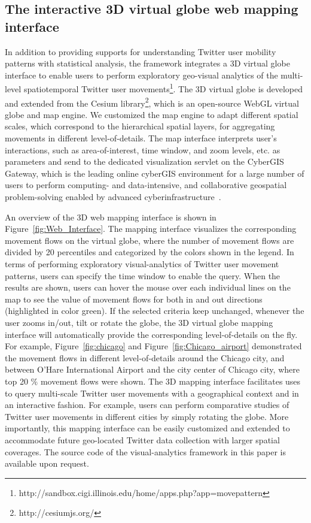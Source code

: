\documentclass[ijgi,article,submit,moreauthors,pdftex,10pt,a4paper]{mdpi}
\theoremstyle{mdpi}
\newcounter{ex}
\newcounter{re}
\theoremstyle{mdpidefinition}
\begin{document}
\subsection{The interactive 3D virtual globe web mapping interface}
In addition to providing supports for understanding Twitter user mobility patterns with statistical analysis, the framework integrates a 3D virtual globe interface to enable users to perform exploratory geo-visual analytics of the multi-level spatiotemporal Twitter user movements\footnote{http://sandbox.cigi.illinois.edu/home/apps.php?app=movepattern}. 
The 3D virtual globe is developed and extended from the Cesium library\footnote{http://cesiumjs.org/}, which is an open-source WebGL virtual globe and map engine.
We customized the map engine to adapt different spatial scales, which correspond to the hierarchical spatial layers, for aggregating movements in different level-of-details.
The map interface interprets user's interactions, such as area-of-interest, time window, and zoom levels, etc. as parameters and send to the dedicated visualization servlet on the CyberGIS Gateway, which is the leading online cyberGIS environment for a large number of users to perform computing- and data-intensive, and collaborative geospatial problem-solving enabled by advanced cyberinfrastructure~\cite{liu2014cybergis}.

An overview of the 3D web mapping interface is shown in Figure~\ref{fig:Web_Interface}.
The mapping interface visualizes the corresponding movement flows on the virtual globe, where the number of movement flows are divided by 20 percentiles and categorized by the colors shown in the legend.
In terms of performing exploratory visual-analytics of Twitter user movement patterns, users can specify the time window to enable the query. 
When the results are shown, users can hover the mouse over each individual lines on the map to see the value of movement flows for both in and out directions (highlighted in color green).
If the selected criteria keep unchanged, whenever the user zooms in/out, tilt or rotate the globe, the 3D virtual globe mapping interface will automatically provide the corresponding level-of-details on the fly.
For example, Figure~\ref{fig:chicago} and Figure~\ref{fig:Chicago_airport} demonstrated the movement flows in different level-of-details around the Chicago city, and between O'Hare International Airport and the city center of Chicago city, where top 20 $\%$ movement flows were shown.
The 3D mapping interface facilitates uses to query multi-scale Twitter user movements with a geographical context and in an interactive fashion.
For example, users can perform comparative studies of Twitter user movements in different cities by simply rotating the globe. 
More importantly, this mapping interface can be easily customized and extended to accommodate future geo-located Twitter data collection with larger spatial coverages.
The source code of the visual-analytics framework in this paper is available upon request.
\end{document}
